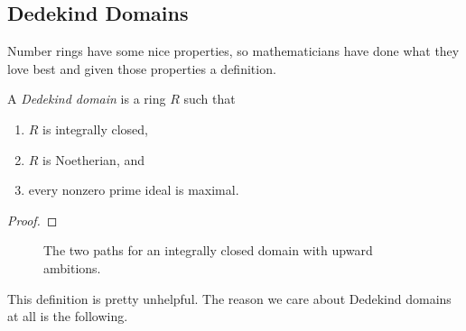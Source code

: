 \subsection{Dedekind Domains}

Number rings have some nice properties, so mathematicians have done what they love best and given those properties a definition.

\begin{definition}

\end{definition}

\begin{definition}
	A \emph{Dedekind domain} is a ring $R$ such that
	\begin{enumerate}
		\item $R$ is integrally closed,
		\item $R$ is Noetherian, and
		\item every nonzero prime ideal is maximal.
	\end{enumerate}
\end{definition}

\begin{theorem}

\end{theorem}

\begin{proof}

\end{proof}

\begin{figure}
	\centering
	\caption{The two paths for an integrally closed domain with upward ambitions.}
\end{figure}

This definition is pretty unhelpful. The reason we care about Dedekind domains at all is the following.

